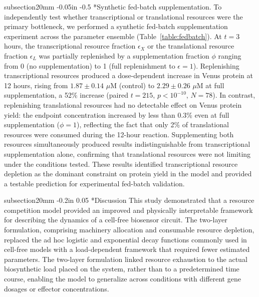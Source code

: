 \documentclass[12pt]{article}
\makeatletter
\renewcommand\subsection{\@startsection
	{subsection}{2}{0mm}
	{-0.05in}
	{-0.5\baselineskip}
	{\normalfont\normalsize\bfseries}}
\renewcommand\section{\@startsection
	{subsection}{2}{0mm}
	{-0.2in}
	{0.05\baselineskip}
	{\normalfont\large\bfseries}}
\makeatother
\begin{document}
\subsection*{Synthetic fed-batch supplementation.}
To independently test whether transcriptional or translational resources were the primary bottleneck, we performed a synthetic fed-batch supplementation experiment across the parameter ensemble (Table~\ref{table:fedbatch}). At $t = 3$ hours, the transcriptional resource fraction $\epsilon_X$ or the translational resource fraction $\epsilon_L$ was partially replenished by a supplementation fraction $\phi$ ranging from 0 (no supplementation) to 1 (full replenishment to $\epsilon = 1$). Replenishing transcriptional resources produced a dose-dependent increase in Venus protein at 12 hours, rising from $1.87 \pm 0.14$ $\mu$M (control) to $2.29 \pm 0.26$ $\mu$M at full supplementation, a 52\% increase (paired $t = 215$, $p < 10^{-10}$, $N = 78$). In contrast, replenishing translational resources had no detectable effect on Venus protein yield: the endpoint concentration increased by less than 0.3\% even at full supplementation ($\phi = 1$), reflecting the fact that only 2\% of translational resources were consumed during the 12-hour reaction. Supplementing both resources simultaneously produced results indistinguishable from transcriptional supplementation alone, confirming that translational resources were not limiting under the conditions tested. These results identified transcriptional resource depletion as the dominant constraint on protein yield in the model and provided a testable prediction for experimental fed-batch validation.

\clearpage

\section*{Discussion}
This study demonstrated that a resource competition model provided an improved and physically interpretable framework for describing the dynamics of a cell-free biosensor circuit. The two-layer formulation, comprising machinery allocation and consumable resource depletion, replaced the ad hoc logistic and exponential decay functions commonly used in cell-free models with a load-dependent framework that required fewer estimated parameters. The two-layer formulation linked resource exhaustion to the actual biosynthetic load placed on the system, rather than to a predetermined time course, enabling the model to generalize across conditions with different gene dosages or effector concentrations.
\end{document}
